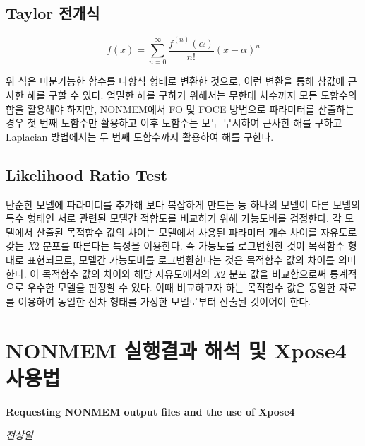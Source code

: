 \documentclass[
  10pt,
]{krantz}
\begin{document}
\hypertarget{taylor-uxc804uxac1cuxc2dd}{%
\section{Taylor 전개식}\label{taylor-uxc804uxac1cuxc2dd}}

\[f(x) = \sum_{n = 0}^{\infty}\frac{f^{\left( n \right)}\left( \alpha \right)}{n!}{(x - \alpha)}^{n}\]

위 식은 미분가능한 함수를 다항식 형태로 변환한 것으로, 이런 변환을 통해 참값에 근사한 해를 구할 수 있다. 엄밀한 해를 구하기
위해서는 무한대 차수까지 모든 도함수의 합을 활용해야 하지만, NONMEM에서 FO 및 FOCE 방법으로 파라미터를 산출하는 경우
첫 번째 도함수만 활용하고 이후 도함수는 모두 무시하여 근사한 해를 구하고 Laplacian 방법에서는 두 번째 도함수까지
활용하여 해를 구한다.

\hypertarget{likelihood-ratio-test}{%
\section{Likelihood Ratio Test}\label{likelihood-ratio-test}}

단순한 모델에 파라미터를 추가해 보다 복잡하게 만드는 등 하나의 모델이 다른 모델의 특수 형태인 서로 관련된 모델간 적합도를
비교하기 위해 가능도비를 검정한다. 각 모델에서 산출된 목적함수 값의 차이는 모델에서 사용된 파라미터 개수 차이를
자유도로 갖는 \emph{Χ}2 분포를 따른다는 특성을 이용한다. 즉 가능도를 로그변환한 것이 목적함수
형태로 표현되므로, 모델간 가능도비를 로그변환한다는 것은 목적함수 값의 차이를 의미한다. 이 목적함수 값의 차이와 해당
자유도에서의 \emph{Χ}2 분포 값을 비교함으로써 통계적으로 우수한 모델을 판정할 수 있다. 이때 비교하고자 하는
목적함수 값은 동일한 자료를 이용하여 동일한 잔차 형태를 가정한 모델로부터 산출된 것이어야 한다.

\hypertarget{nonmem-uxc2e4uxd589uxacb0uxacfc-uxd574uxc11d-uxbc0f-xpose4-uxc0acuxc6a9uxbc95}{%
\chapter{NONMEM 실행결과 해석 및 Xpose4 사용법}\label{nonmem-uxc2e4uxd589uxacb0uxacfc-uxd574uxc11d-uxbc0f-xpose4-uxc0acuxc6a9uxbc95}}

\textbf{Requesting NONMEM output files and the use of Xpose4}

\emph{전상일}
\end{document}
